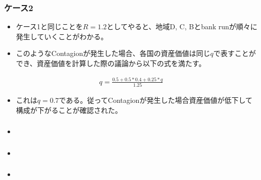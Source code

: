 \documentclass[dvipdfmx, 12pt]{beamer}
\begin{document}
\begin{frame}\frametitle{ケース2}
	\begin{itemize}
	\item ケース1と同じことを$R = 1.2$としてやると、地域D, C, Bとbank runが順々に発生していくことがわかる。
	\item このようなContagionが発生した場合、各国の資産価値は同じ$q$で表すことができ、資産価値を計算した際の議論から以下の式を満たす。
	\end{itemize}
	\begin{align*}
		q = \frac{0.5 + 0.5 * 0.4 + 0.25 * q}{1.25}
	\end{align*}
	\begin{itemize}
	\item これは$q = 0.7$である。従ってContagionが発生した場合資産価値が低下して構成が下がることが確認された。
	\end{itemize}
\end{frame}

\begin{frame}\frametitle{}
	\begin{itemize}
	\item 
	\end{itemize}
\end{frame}

\begin{frame}\frametitle{}
	\begin{itemize}
	\item 
	\end{itemize}
\end{frame}

\begin{frame}\frametitle{}
	\begin{itemize}
	\item 
	\end{itemize}
\end{frame}
\end{document}
